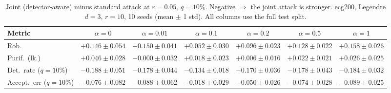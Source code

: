 \begin{table}[htbp]
  \centering
  \small
  \begin{tabular}{@{}lcccccc@{}}
    \toprule
    Metric & $\alpha{=}0$ & $\alpha{=}0.01$ & $\alpha{=}0.1$ & $\alpha{=}0.2$ & $\alpha{=}0.5$ & $\alpha{=}1$ \\
    \midrule
    Rob. & $+0.146 \pm 0.054$ & $+0.150 \pm 0.041$ & $+0.052 \pm 0.030$ & $+0.096 \pm 0.023$ & $+0.128 \pm 0.022$ & $+0.158 \pm 0.026$ \\
    Purif.\ (lk.) & $+0.046 \pm 0.028$ & $-0.000 \pm 0.032$ & $+0.018 \pm 0.023$ & $+0.006 \pm 0.016$ & $+0.022 \pm 0.021$ & $+0.026 \pm 0.025$ \\
    Det.\ rate ($q{=}10\%$) & $-0.188 \pm 0.051$ & $-0.178 \pm 0.044$ & $-0.134 \pm 0.018$ & $-0.170 \pm 0.036$ & $-0.178 \pm 0.043$ & $-0.184 \pm 0.032$ \\
    Accept.\ err ($q{=}10\%$) & $-0.076 \pm 0.082$ & $-0.088 \pm 0.062$ & $-0.018 \pm 0.029$ & $-0.050 \pm 0.026$ & $-0.074 \pm 0.028$ & $-0.089 \pm 0.025$ \\
    \bottomrule
  \end{tabular}
  \caption{Joint (detector-aware) minus standard attack at $\varepsilon=0.05$, $q{=}10\%$. Negative $\Rightarrow$ the joint attack is stronger. ecg200, Legendre $d{=}3$, $r{=}10$, 10 seeds (mean $\pm$ 1 std). All columns use the full test split.}
  \label{tab:ecg200_joint_r10_eps0.05}
\end{table}
